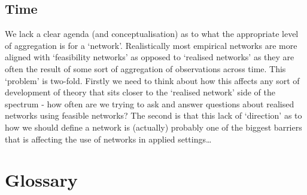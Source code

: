 \documentclass[
]{article}
\begin{document}
\subsection{Time}\label{time}

We lack a clear agenda (and conceptualisation) as to what the
appropriate level of aggregation is for a `network'. Realistically most
empirical networks are more aligned with `feasibility networks' as
opposed to `realised networks' as they are often the result of some sort
of aggregation of observations across time. This `problem' is two-fold.
Firstly we need to think about how this affects any sort of development
of theory that sits closer to the `realised network' side of the
spectrum - how often are we trying to ask and answer questions about
realised networks using feasible networks? The second is that this lack
of `direction' as to how we should define a network is (actually)
probably one of the biggest barriers that is affecting the use of
networks in applied settings\ldots{}

\section*{Glossary}\label{glossary}
\end{document}

